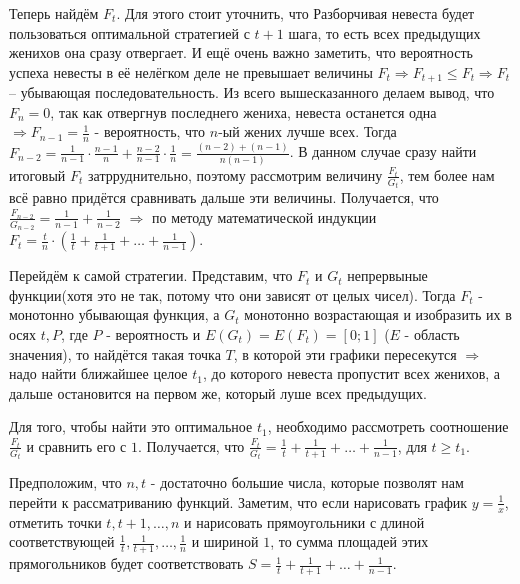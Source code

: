 \documentclass[12pt]{article}
\newcounter{problem}[section]
\newenvironment{problem}%
{%
\refstepcounter{problem}%
     \hypertarget{problem:{\thesection.\theproblem}}{} %
     \Writetofile{solution_file}{\protect\hypertarget{soln:\thesection.\theproblem}{}}
     \begin{myenum}[label=\bfseries\protect\hyperlink{soln:\thesection.\theproblem}{\thesection.\theproblem},ref=\thesection.\theproblem]
     \item%
    }%
    {%
    \end{myenum}}
\begin{document}
\begin{problem}
\begin{sol}
Теперь найдём $F_t$. Для этого стоит уточнить, что Разборчивая невеста будет пользоваться оптимальной стратегией с $t+1$ шага, то есть всех предыдущих женихов она сразу отвергает. И ещё очень важно заметить, что вероятность успеха невесты в её нелёгком деле не превышает величины $F_t \Rightarrow F_{t+1} \le F_t \Rightarrow F_t$ – убывающая последовательность. Из всего вышесказанного делаем вывод, что $F_n = 0$, так как отвергнув последнего жениха, невеста останется одна $\Rightarrow F_{n-1}=\frac{1}{n}$ - вероятность, что $n$-ый жених лучше всех. Тогда $F_{n-2}=\frac{1}{n-1}\cdot\frac{n-1}{n}+\frac{n-2}{n-1}\cdot\frac{1}{n}=\frac{(n-2)+(n-1)}{n(n-1)}$. В данном случае сразу найти итоговый $F_t$ затрруднительно, поэтому рассмотрим величину $\frac{F_t}{G_t}$, тем более нам всё равно придётся сравнивать дальше эти величины. Получается, что $\frac{F_{n-2}}{G_{n-2}}=\frac{1}{n-1}+\frac{1}{n-2}$ $\Rightarrow$ по методу математической индукции $F_t = \frac{t}{n} \cdot (\frac{1}{t}+\frac{1}{t+1}+\ldots +\frac{1}{n-1})$.

Перейдём к самой стратегии. Представим, что $F_t$ и $G_t$ непрервыные функции(хотя это не так, потому что они зависят от целых чисел). Тогда $F_t$ - монотонно убывающая функция, а $G_t$ монотонно возрастающая и изобразить их в осях $t, P$, где $P$ - вероятность и $E(G_t)=E(F_t)=[0;1]$ ($E$ - область значения), то найдётся такая точка $T$, в которой эти графики пересекутся $\Rightarrow$ надо найти ближайшее целое $t_1$, до которого невеста пропустит всех женихов, а дальше остановится на первом же, который луше всех предыдущих.

Для того, чтобы найти это оптимальное $t_1$, необходимо рассмотреть соотношение $\frac{F_t}{G_t}$ и сравнить его с $1$. Получается, что $\frac{F_t}{G_t}= \frac{1}{t}+\frac{1}{t+1}+\ldots +\frac{1}{n-1}$, для $t \ge t_1$.

Предположим, что $n, t$ - достаточно большие числа, которые позволят нам перейти к рассматриванию функций. Заметим, что если нарисовать график $y=\frac{1}{x}$, отметить точки $t, t+1,\ldots , n$ и нарисовать прямоугольники с длиной соответствующей  $\frac{1}{t}, \frac{1}{t+1},\ldots ,\frac{1}{n}$ и шириной $1$, то сумма площадей этих прямогольников будет соответствовать $S = \frac{1}{t}+\frac{1}{t+1}+\ldots +\frac{1}{n-1}$.


\end{sol}
\end{problem}
\end{document}
